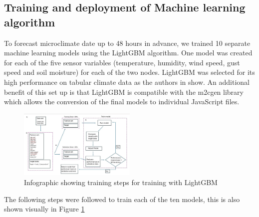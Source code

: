 \documentclass[conference]{IEEEtran}
\begin{document}
\subsection{Training and deployment of Machine learning algorithm}

To forecast microclimate date up to 48 hours in advance, we trained 10 separate
machine learning models using the LightGBM algorithm. One model was created for
each of the five sensor variables (temperature, humidity, wind speed, gust speed
and soil moisture) for each of the two nodes. LightGBM was selected for its high
performance on tabular climate data as the authors in
\cite{abdelmadjid2025enhancing} show. An additional benefit of this set up is
that LightGBM is compatible with the m2cgen library which allows the conversion
of the final models to individual JavaScript files.

\begin{figure}[htbp]
\centerline{\includegraphics[width=0.5\textwidth]{figures/machine-learning-diagram2.jpg}}
\caption{Infographic showing training steps for training with LightGBM}
\label{machine-learning}
\end{figure}

The following steps were followed to train each of the ten models, this is also
shown visually in Figure \ref{machine-learning}
\end{document}
